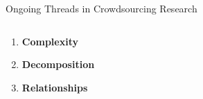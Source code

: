 \documentclass[presentation]{subfiles}
\begin{document}
\begin{frame}{Ongoing Threads in Crowdsourcing Research}
\begin{columns}
\begin{column}[T]{0.5\textwidth}
  \begin{enumerate}%
    \item<2,4> \textbf{\large Complexity}\\
    \scriptsize{
    \textcite{suzukiAtelier,KimStoria,yuanAlmost,Yu2016b,Nebeling:2016:WCW:2858036.2858169,Hahn:2016:KAB:2858036.2858364}
    }
    \vspace{5mm}
    
    \item<3> \textbf{\large Decomposition}\\
    \scriptsize{
    \textcite{sensitiveTasks,LykourentzouPersonalityMatters,Law:2016:CKC:2858036.2858144,Chang:2016:ACC:2858036.2858411,Newell:2016:OMA:2858036.2858490}
    }
    \vspace{5mm}

    \item<5> \textbf{\large Relationships}\\
    \scriptsize{
      \textcite{turkopticon,storiesIraniSilberman,crowdcollab,takingAHITMcInnis,dynamo,uberAlgorithm}
    }

  \end{enumerate}
\end{column}

\begin{column}[T]{0.25\textwidth}
  \begin{figure}
    \centering
    \vspace{0mm}


\end{figure}
\end{column}
\end{columns}
\end{frame}
\end{document}
